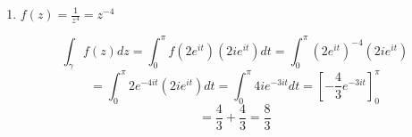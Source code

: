 \documentclass{article}
\begin{document}
\begin{enumerate}
\begin{enumerate}
		\item $f(z)=\frac{1}{z^4}=z^{-4}$
		
		\[\int_{\gamma}f(z)dz=\int_{0}^{\pi}f(2e^{it})(2ie^{it})dt =\int_{0}^{\pi}(2e^{it})^{-4}(2ie^{it}) \]
		\[=\int_{0}^{\pi}2e^{-4it}(2ie^{it})dt=\int_{0}^{\pi}4ie^{-3it}dt=\left[-\frac{4}{3}e^{-3it} \right]_{0}^{\pi} \]
		\[ =\frac{4}{3}+\frac{4}{3}=\frac{8}{3} \]
	\end{enumerate}
\end{enumerate}

\end{document}
